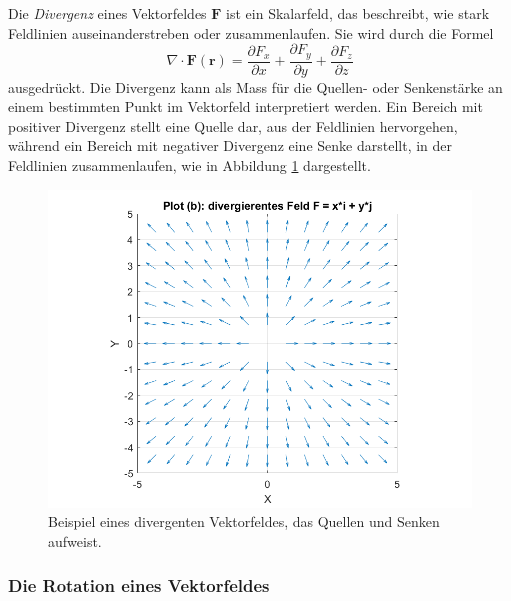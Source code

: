 Die \emph{Divergenz} eines Vektorfeldes $\boldsymbol{F}$ ist ein Skalarfeld,
%
das beschreibt, wie stark Feldlinien auseinanderstreben oder
zusammenlaufen.
Sie wird durch die Formel
\begin{equation}
\nabla \cdot \boldsymbol{F}(\boldsymbol{r})
=
\frac{\partial F_x}{\partial x}
+
\frac{\partial F_y}{\partial y}
+
\frac{\partial F_z}{\partial z}
\end{equation}
ausgedrückt.
Die Divergenz kann als Mass für die Quellen- oder Senkenstärke an
einem bestimmten Punkt im Vektorfeld interpretiert werden.
Ein Bereich mit positiver Divergenz stellt eine Quelle dar, aus der
%
Feldlinien hervorgehen, während ein Bereich mit negativer Divergenz
eine Senke darstellt, in der Feldlinien zusammenlaufen, wie in
%
Abbildung \ref{fig:DivergenzAlg} dargestellt.

\begin{figure}
    \centering
    \includegraphics[scale=0.4]{papers/helmholtz/images/divergentes_Feld.png}
    \caption{Beispiel eines divergenten Vektorfeldes, das Quellen und Senken aufweist.}
    \label{fig:DivergenzAlg}
\end{figure}

\subsubsection{Die Rotation eines Vektorfeldes}

